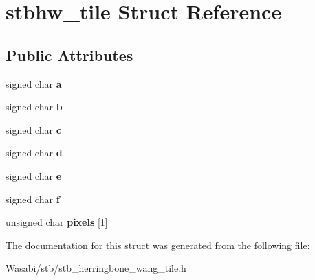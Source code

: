 \hypertarget{structstbhw__tile}{}\section{stbhw\+\_\+tile Struct Reference}
\label{structstbhw__tile}
\subsection*{Public Attributes}
\begin{DoxyCompactItemize}
\item 
signed char {\bfseries a}\hypertarget{structstbhw__tile_a85416cca3b85fa91215eed398f18917d}{}\label{structstbhw__tile_a85416cca3b85fa91215eed398f18917d}

\item 
signed char {\bfseries b}\hypertarget{structstbhw__tile_a0783e57911f1285e3a4e01b415e9dc37}{}\label{structstbhw__tile_a0783e57911f1285e3a4e01b415e9dc37}

\item 
signed char {\bfseries c}\hypertarget{structstbhw__tile_ade5ad94e6aed9e6264fcc6d655570c98}{}\label{structstbhw__tile_ade5ad94e6aed9e6264fcc6d655570c98}

\item 
signed char {\bfseries d}\hypertarget{structstbhw__tile_a8911859edd7561523295673f0c16766e}{}\label{structstbhw__tile_a8911859edd7561523295673f0c16766e}

\item 
signed char {\bfseries e}\hypertarget{structstbhw__tile_a8a8af24460767d0995cd9a2e4b92bdd7}{}\label{structstbhw__tile_a8a8af24460767d0995cd9a2e4b92bdd7}

\item 
signed char {\bfseries f}\hypertarget{structstbhw__tile_a33db40cfd2cb3ab4ed0740526ba35281}{}\label{structstbhw__tile_a33db40cfd2cb3ab4ed0740526ba35281}

\item 
unsigned char {\bfseries pixels} \mbox{[}1\mbox{]}\hypertarget{structstbhw__tile_aeee432089fc26df1d8a8f687babade0b}{}\label{structstbhw__tile_aeee432089fc26df1d8a8f687babade0b}

\end{DoxyCompactItemize}


The documentation for this struct was generated from the following file\+:\begin{DoxyCompactItemize}
\item 
Wasabi/stb/stb\+\_\+herringbone\+\_\+wang\+\_\+tile.\+h\end{DoxyCompactItemize}
